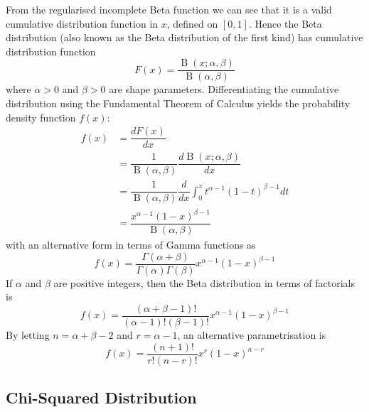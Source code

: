 \documentclass[11pt]{report} %
\begin{document}
From the regularised incomplete Beta function we can see that it is a valid cumulative distribution function in $x$, defined on $\left[0, 1\right]$. Hence the Beta distribution (also known as the Beta distribution of the first kind) has cumulative distribution function
\begin{equation}
F\left(x\right) = \dfrac{\operatorname{B}\left(x; \alpha, \beta\right)}{\operatorname{B}\left(\alpha, \beta\right)}
\end{equation}
where $\alpha > 0$ and $\beta > 0$ are shape parameters. Differentiating the cumulative distribution using the Fundamental Theorem of Calculus yields the probability density function $f\left(x\right)$:
\begin{align}
f\left(x\right) &= \dfrac{dF\left(x\right)}{dx} \\
&= \dfrac{1}{\operatorname{B}\left(\alpha, \beta\right)}\dfrac{d\operatorname{B}\left(x; \alpha, \beta\right)}{dx} \\
&= \dfrac{1}{\operatorname{B}\left(\alpha, \beta\right)}\dfrac{d}{dx}\int_{0}^{x}t^{\alpha - 1}\left(1-t\right)^{\beta - 1}dt \\
&= \dfrac{x^{\alpha - 1}\left(1-x\right)^{\beta - 1}}{\operatorname{B}\left(\alpha, \beta\right)}
\end{align}
with an alternative form in terms of Gamma functions as
\begin{equation}
f\left(x\right) = \dfrac{\Gamma\left(\alpha + \beta\right)}{\Gamma\left(\alpha\right)\Gamma\left(\beta\right)}x^{\alpha - 1}\left(1-x\right)^{\beta - 1}
\end{equation}
If $\alpha$ and $\beta$ are positive integers, then the Beta distribution in terms of factorials is
\begin{equation}
f\left(x\right) = \dfrac{\left(\alpha + \beta - 1\right)!}{\left(\alpha - 1\right)!\left(\beta - 1\right)!}x^{\alpha - 1}\left(1-x\right)^{\beta - 1}
\end{equation}
By letting $n = \alpha + \beta - 2$ and $r = \alpha - 1$, an alternative parametrisation is
\begin{equation}
f\left(x\right) = \dfrac{\left(n + 1\right)!}{r!\left(n - r\right)!}x^{r}\left(1-x\right)^{n - r}
\end{equation}

\subsection{Chi-Squared Distribution}
\end{document}
